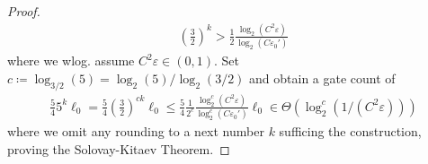 \documentclass[10pt]{amsart}
\theoremstyle{definition}
\theoremstyle{remark}
\begin{document}
\begin{proof}
        \begin{align}
            \left(\frac{3}{2}\right)^k > \frac{1}{2}\frac{\log_2(C^2\varepsilon)}{\log_2(C\varepsilon_0')}
        \end{align}
        where we wlog. assume \(C^2\varepsilon \in (0, 1)\). Set \(c \coloneqq \log_{3/2}(5) = \log_2(5)/\log_2(3/2)\) and obtain a gate count of
        \begin{align}
            \frac{5}{4} 5^k \ell_0 = \frac{5}{4} \left(\frac{3}{2}\right)^{ck} \ell_0 \leq \frac{5}{4} \frac{1}{2^c}\frac{\log_2^c(C^2\varepsilon)}{\log_2^c(C\varepsilon_0')} \ell_0 \in \Theta(\log_2^c(1/(C^2\varepsilon)))
        \end{align}
        where we omit any rounding to a next number \(k\) sufficing the construction, proving the Solovay-Kitaev Theorem.
    \end{proof}

    \printbibliography{}
\end{document}
